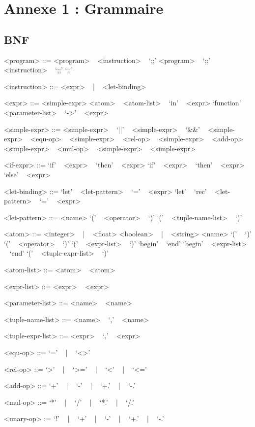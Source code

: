 \documentclass[paper=a4, fontsize=11pt]{scrartcl}
\numberwithin{equation}{section}		%
\numberwithin{figure}{section}			%
\numberwithin{table}{section}				%
\begin{document}
\newpage
\section{Annexe 1 : Grammaire}

\subsection{BNF}
\begin{grammar}

<program> ::= <program> ~ <instruction> ~ `;;'
\alt <program> ~ `;;'
\alt <instruction> ~ `;;'
\alt `;;'

<instruction> ::= <expr> ~ | ~ <let-binding>

<expr> ::= <simple-expr>
\alt <atom> ~ <atom-list>
 ~ `in' ~ <expr>
\alt `function' ~ <parameter-list> ~ `->' ~ <expr>

<simple-expr> ::= <simple-expr> ~ `||' ~ <simple-expr>
 ~ `&&' ~ <simple-expr>
 ~ <equ-op> ~ <simple-expr>
 ~ <rel-op> ~ <simple-expr>
 ~ <add-op> ~ <simple-expr>
 ~ <mul-op> ~ <simple-expr>
 ~ <simple-expr>

<if-expr> ::= `if' ~ <expr> ~ `then' ~ <expr>
\alt `if' ~ <expr> ~ `then' ~ <expr> ~ `else' ~ <expr>

<let-binding> ::= `let' ~ <let-pattern> ~ `=' ~ <expr>
\alt `let' ~ `rec' ~ <let-pattern> ~ `=' ~ <expr>

<let-pattern> ::= <name>
\alt `(' ~ <operator> ~ `)'
\alt `(' ~ <tuple-name-list> ~ `)'

<atom> ::= <integer> ~ | ~ <float>
\alt <boolean> ~ | ~ <string>
\alt <name>
\alt `(' ~ `)'
\alt `(' ~ <operator> ~ `)'
\alt `(' ~ <expr-list> ~ `)'
\alt `begin' ~ `end'
\alt `begin' ~ <expr-list> ~ `end'
\alt `(' ~ <tuple-expr-list> ~ `)'

<atom-list> ::= <atom>
 ~ <atom>

<expr-list> ::= <expr>
 ~ <expr>

<parameter-list> ::= <name>
 ~ <name>

<tuple-name-list> ::= <name>
 ~ `,' ~ <name>

<tuple-expr-list> ::= <expr>
 ~ `,' ~ <expr>

<equ-op> ::= `=' ~ | ~ `<>'

<rel-op> ::= `>' ~ | ~ `>=' ~ | ~ `<' ~ | ~ `<='

<add-op> ::= `+' ~ | ~ `-' ~ | ~ `+.' ~ | ~ `-.'

<mul-op> ::= `*' ~ | ~ `/' ~ | ~ `*.' ~ | ~ `/.' 

<unary-op> := `!' ~ | ~ `+' ~ | ~ `-' ~ | ~ `+.' ~ | ~ `-.'

\end{grammar}
\end{document}
